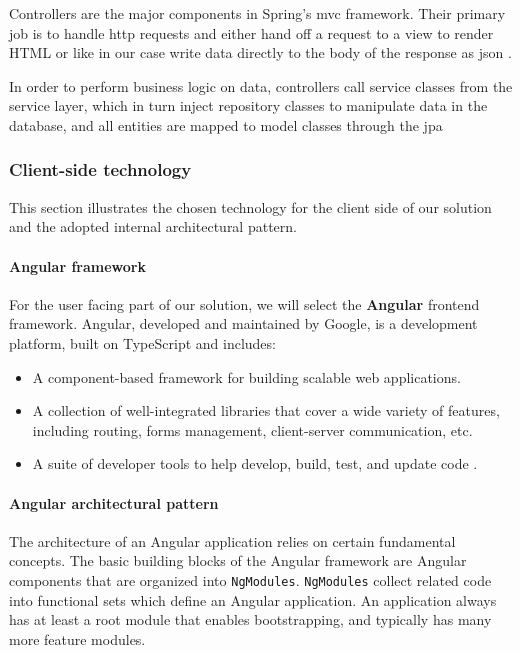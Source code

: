 Controllers are the major components in Spring’s \acrshort{mvc} framework. Their primary job is to handle
\acrshort{http} requests and either hand off a request to a view to render HTML or like in our case
write data directly to the body of the response as \acrshort{json} \cite{spring-in-action}.

In order to perform business logic on data, controllers call service classes from the service layer,
which in turn inject repository classes to manipulate data in the database, and all entities are mapped
to model classes through the \acrfull{jpa}


\subsubsection{Client-side technology}
\label{cst}
This section illustrates the chosen technology for the client side of our solution and the adopted
internal architectural pattern.

\paragraph{Angular framework} \mbox{} \newline \newline
For the user facing part of our solution, we will select the \textbf{Angular} frontend framework.
Angular, developed and maintained by Google, is a development platform, built on TypeScript and
includes:
\begin{itemize}
      \item A component-based framework for building scalable web applications.
      \item A collection of well-integrated libraries that cover a wide variety of features,
            including routing, forms management, client-server communication, etc.
      \item A suite of developer tools to help develop, build, test, and update code \cite{angular}. \\
\end{itemize}


\paragraph{Angular architectural pattern} \mbox{} \newline \newline
The architecture of an Angular application relies on certain fundamental concepts. The basic building
blocks of the Angular framework are Angular components that are organized into \texttt{NgModules}.
\texttt{NgModules} collect related code into functional sets which define an Angular application.
An application always has at least a root module that enables bootstrapping, and typically has many
more feature modules. \\ \newline

